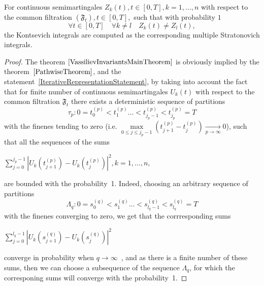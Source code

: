 \documentclass[12pt, a4paper, titlepage]{article}
\begin{document}
\begin{theorem}\label{VassilievInvariantsMainTheorem}
 For continuous semimartingales $Z_k(t), t\in [0,T], k = 1,\dots, n$ 
with respect to the common filtration $(\mathfrak{F}_t), t\in[0,T],$
such that with probability $1$ 
$$\forall t\in [0,T] \quad \forall k\ne l \quad Z_k(t)\ne Z_l(t),$$
the Kontsevich integrals are computed as the corresponding multiple Stratonovich integrals. 
\end{theorem}
\begin{proof}
The theorem $\ref{VassilievInvariantsMainTheorem}$ 
is obviously implied by the theorem~$\ref{PathwiseTheorem}$, 
and the statement~\ref{IterativeRepresentationStatement}, by taking into account the fact that
for finite number of continuous semimartingales $U_k(t)$
with respect to the common filtration $\mathfrak{F}_t$ there exists a deterministic
sequence of partitions 
\begin{equation}\nonumber
 \tau_p: 0 = t_0^{(p)}<t_1^{(p)}\ldots<t_{j_p-1}^{(p)}<t_{j_p}^{(p)}=T
\end{equation}
with the finenes tending to zero
(i.e. $\max\limits_{0\le j\le j_p-1}(t_{j+1}^{(p)}-t_j^{(p)})\xrightarrow[p\to\infty]{} 0$), 
such that all the sequences of the sums
\begin{center}
 $\sum\limits_{j=0}^{j_p - 1}|U_k(t_{j+1}^{(p)})-U_k(t_j^{(p)})|^2, k=1,\ldots,n,$
\end{center}
 are bounded with the probability~1. Indeed, choosing an arbitrary 
sequence of partitions
\begin{equation}\nonumber
\Lambda_q: 0 = s_0^{(q)}<s_1^{(q)}\ldots<s_{l_q-1}^{(q)}<s_{l_q}^{(q)}=T
\end{equation}
 with the finenes converging to zero, we get that the corrresponding sums
\begin{center}
$\sum\limits_{j=0}^{l_q - 1}|U_k(s_{j+1}^{(q)})-U_k(s_j^{(q)})|^2$
\end{center}
converge in probability when $q\to\infty$~\cite[p.~51]{Kunita}, 
and as there is a finite number of these sums,
then we can choose a subsequence of the sequence $\Lambda_q$, 
for which the corresponing sums will converge with the probability~1.
\end{proof}
\end{document}
